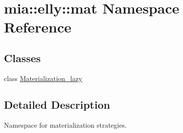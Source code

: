 \hypertarget{namespacemia_1_1elly_1_1mat}{\section{mia\-:\-:elly\-:\-:mat Namespace Reference}
\label{namespacemia_1_1elly_1_1mat}
}
\subsection*{Classes}
\begin{DoxyCompactItemize}
\item 
class \hyperlink{classmia_1_1elly_1_1mat_1_1_materialization__lazy}{Materialization\-\_\-lazy}
\end{DoxyCompactItemize}


\subsection{Detailed Description}
Namespace for materialization strategies. 